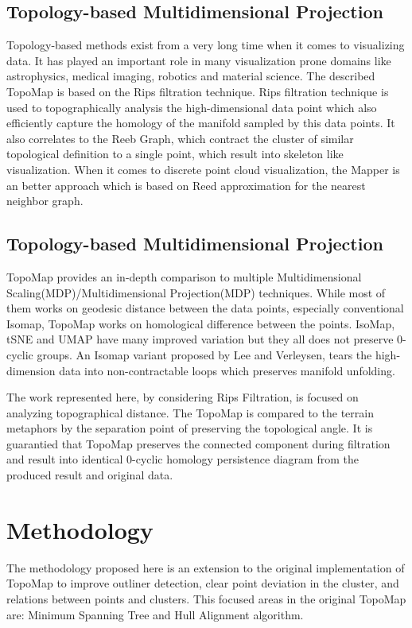\documentclass[11pt, a4paper]{article}
\begin{document}
\begin{multicols}{2}
        \subsection{Topology-based Multidimensional Projection}
            Topology-based methods exist from a very long time when it comes to visualizing data. It has played an important role in many visualization prone domains like astrophysics, medical imaging, robotics and material science. The described TopoMap is based on the Rips\cite{rips} filtration technique. Rips filtration technique is used to topographically analysis the high-dimensional data point which also efficiently capture the homology of the manifold sampled by this data points. It also correlates to the Reeb Graph\cite{reedgraph}, which contract the cluster of similar topological definition to a single point, which result into skeleton like visualization. When it comes to discrete point cloud visualization, the Mapper\cite{mapper} is an better approach which is based on Reed\cite{reedgraph} approximation for the nearest neighbor graph.

        \subsection{Topology-based Multidimensional Projection}
            TopoMap\cite{harishd} provides an in-depth comparison to multiple Multidimensional Scaling(MDP)/Multidimensional Projection(MDP) techniques. While most of them works on geodesic distance between the data points, especially conventional Isomap, TopoMap\cite{harishd} works on homological difference between the points. IsoMap, tSNE and UMAP have many improved variation but they all does not preserve 0-cyclic groups. An Isomap variant proposed by Lee and Verleysen\cite{leeverleysen}, tears the high-dimension data into non-contractable loops which preserves manifold unfolding. 
        
        The work represented here, by considering Rips Filtration\cite{rips}, is focused on analyzing topographical distance. The TopoMap is compared to the terrain metaphors by the separation point of preserving the topological angle. It is guarantied that TopoMap preserves the connected component during filtration and result into identical 0-cyclic homology persistence diagram from the produced result and original data.
    \section{Methodology}
    The methodology proposed here is an extension to the original implementation of TopoMap\cite{harishd} to improve outliner detection, clear point deviation in the cluster, and relations between points and clusters. This focused areas in the original TopoMap\cite{harishd} are: Minimum Spanning Tree and Hull Alignment algorithm.

\end{multicols}
\end{document}
